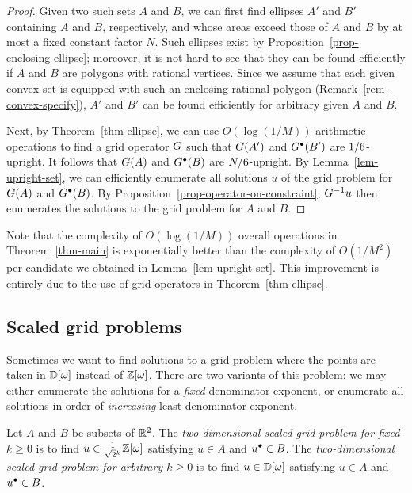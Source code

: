 \documentclass{article}
\begin{document}
\begin{proof}
  Given two such sets $A$ and $B$, we can first find ellipses $A'$ and
  $B'$ containing $A$ and $B$, respectively, and whose areas exceed
  those of $A$ and $B$ by at most a fixed constant factor $N$. Such
  ellipses exist by Proposition~\ref{prop-enclosing-ellipse}; moreover,
  it is not hard to see that they can be found efficiently if $A$ and
  $B$ are polygons with rational vertices. Since we assume that each
  given convex set is equipped with such an enclosing rational polygon
  (Remark~\ref{rem-convex-specify}), $A'$ and $B'$ can be found
  efficiently for arbitrary given $A$ and $B$.
  
  Next, by Theorem~\ref{thm-ellipse}, we can use $O(\log(1/M))$
  arithmetic operations to find a grid operator $G$ such that
  $G(A')$ and $G^{\bullet}(B')$ are $1/\formula{\oneoverM}$-upright. It
  follows that $G(A)$ and $G^{\bullet}(B)$ are
  $N/\formula{\oneoverM}$-upright. By Lemma~\ref{lem-upright-set}, we
  can efficiently enumerate all solutions $u$ of the grid problem for
  $G(A)$ and $G^{\bullet}(B)$. By
  Proposition~\ref{prop-operator-on-constraint}, $G^{-1} u$ then
  enumerates the solutions to the grid problem for $A$ and $B$.
\end{proof}

\begin{remark}
  Note that the complexity of $O(\log(1/M))$ overall operations in
  Theorem~\ref{thm-main} is exponentially better than the
  complexity of $O(1/M^2)$ per candidate we obtained in
  Lemma~\ref{lem-upright-set}. This improvement is entirely due to the
  use of grid operators in Theorem~\ref{thm-ellipse}.
\end{remark}

\subsection{Scaled grid problems}

Sometimes we want to find solutions to a grid problem where the points
are taken in ${\mathbb{D}}[\omega]$ instead of $\mathbb{Z}[\omega]$. There are two
variants of this problem: we may either enumerate the solutions for a
{\em fixed} denominator exponent, or enumerate all solutions in order
of {\em increasing} least denominator exponent.

\begin{definition}
  Let $A$ and $B$ be subsets of ${\mathbb{R}}^2$. The {\em two-dimensional
    scaled grid problem for fixed $k\geq 0$} is to find
  $u\in\frac{1}{\sqrt{2}{}^{k}}\mathbb{Z}[\omega]$ satisfying $u\in A$ and $u^{\bullet}\in B$.  The
  {\em two-dimensional scaled grid problem for arbitrary $k\geq 0$} is
  to find $u\in{\mathbb{D}}[\omega]$ satisfying $u\in A$ and $u^{\bullet}\in
  B$.
\end{definition}
\end{document}
